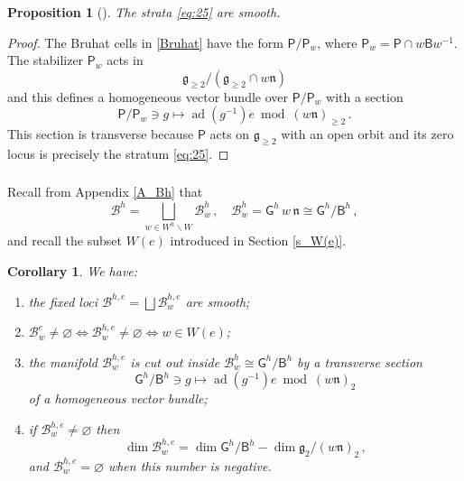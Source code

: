 \documentclass[14pt]{extarticle}
\newcommand{\bG}{\mathsf{G}}
\newcommand{\sP}{\mathsf{P}}
\newcommand{\bB}{\mathsf{B}}
\newcommand{\cB}{\mathscr{B}}
\newcommand{\fg}{\mathfrak{g}}
\newcommand{\fn}{\mathfrak{n}}
\DeclareMathOperator{\ad}{ad}
\newtheorem{Proposition}[Lemma]{Proposition}
\newtheorem{Corollary}[Lemma]{Corollary}
\theoremstyle{definition}
\begin{document}
\begin{Proposition}[\cite{dCLP}]
The strata \eqref{eq:25} are smooth. 
\end{Proposition}

\begin{proof}
  The Bruhat cells in \eqref{Bruhat} have the form $\sP/\sP_w$, where
  $\sP_w = \sP \cap w \bB w^{-1}$. The stabilizer $\sP_w$ acts in
  \[
    \fg_{\ge 2} \big/ \left(\fg_{\ge 2} \cap w \fn \right) 
  \]
  and this defines a homogeneous vector bundle over $\sP/\sP_w$ with a
  section
  \[
    \sP/\sP_w \owns g \mapsto \ad(g^{-1}) e \bmod
  \left( w \fn \right)_ {\ge 2} \,.
  \]
  This section is transverse because $\sP$ acts on $\fg_{\ge 2}$ with an open orbit and
  its zero locus is precisely the stratum \eqref{eq:25}. 
\end{proof}

\subsubsection{}

Recall from  Appendix \ref{A_Bh} that 
%
\begin{equation}
  \cB^h = \bigsqcup_{w\in W^h\backslash W}  \cB^h_w\,, \quad
  \cB^h_w = \bG^h \, w \, \fn  \cong \bG^h/\bB^h \label{eq:85_} \,, 
\end{equation}
%
and recall the subset $W(e)$ introduced in Section \ref{s_W(e)}.

\begin{Corollary}\label{c_dCLP} 
  We have: 
  \begin{enumerate}
  \item[(1)] the fixed loci $\cB^{h,e}=\bigsqcup \cB^{h,e}_w$ are smooth;
  \item[(2)] $ \cB^{e}_w \ne \varnothing \Leftrightarrow \cB^{h,e}_w \ne \varnothing \Leftrightarrow
    w \in W(e)$;
    \item[(3)] the manifold $\cB^{h,e}_w$ is cut out inside
      $\cB^{h}_w\cong \bG^h/\bB^h$ by a transverse section 
      \[
        \bG^h/\bB^h  \owns g \mapsto \ad(g^{-1}) e \bmod \left( w \fn \right)_2
  \]
  of a homogeneous vector bundle;
\item[(4)] if  $\cB^{h,e}_w\ne \varnothing$ then
  \begin{equation}
  \dim \cB^{h,e}_w = \dim \bG^h/\bB^h -
  \dim \fg_2 \big/\left( w \fn \right)_2\label{eq:35} \,, 
 \end{equation}
 and $\cB^{h,e}_w= \varnothing$ when this number is negative. 
  \end{enumerate}
%
\end{Corollary}
\end{document}
